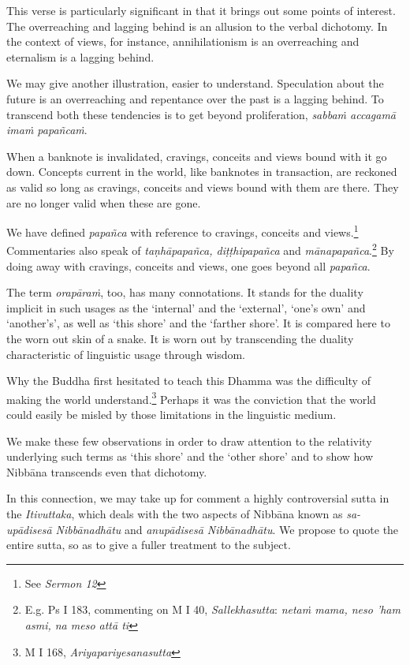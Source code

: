 This verse is particularly significant in that it brings out some points of interest. The overreaching and lagging behind is an allusion to the verbal dichotomy. In the context of views, for instance, annihilationism is an overreaching and eternalism is a lagging behind.

We may give another illustration, easier to understand. Speculation about the future is an overreaching and repentance over the past is a lagging behind. To transcend both these tendencies is to get beyond proliferation, \emph{sabbaṁ accagamā imaṁ papañcaṁ}.

When a banknote is invalidated, cravings, conceits and views bound with it go down. Concepts current in the world, like banknotes in transaction, are reckoned as valid so long as cravings, conceits and views bound with them are there. They are no longer valid when these are gone.

We have defined \emph{papañca} with reference to cravings, conceits and views.\footnote{See \emph{Sermon 12}} Commentaries also speak of \emph{taṇhāpapañca, diṭṭhipapañca} and \emph{mānapapañca}.\footnote{E.g. Ps I 183, commenting on M I 40, \emph{Sallekhasutta}: \emph{netaṁ mama, neso 'ham asmi, na meso attā ti}} By doing away with cravings, conceits and views, one goes beyond all \emph{papañca}.

The term \emph{orapāraṁ}, too, has many connotations. It stands for the duality implicit in such usages as the `internal' and the `external', `one's own' and `another's', as well as `this shore' and the `farther shore'. It is compared here to the worn out skin of a snake. It is worn out by transcending the duality characteristic of linguistic usage through wisdom.

Why the Buddha first hesitated to teach this Dhamma was the difficulty of making the world understand.\footnote{M I 168, \emph{Ariyapariyesanasutta}} Perhaps it was the conviction that the world could easily be misled by those limitations in the linguistic medium.

We make these few observations in order to draw attention to the relativity underlying such terms as `this shore' and the `other shore' and to show how Nibbāna transcends even that dichotomy.

In this connection, we may take up for comment a highly controversial sutta in the \emph{Itivuttaka}, which deals with the two aspects of Nibbāna known as \emph{sa-upādisesā Nibbānadhātu} and \emph{anupādisesā Nibbānadhātu}. We propose to quote the entire sutta, so as to give a fuller treatment to the subject.


